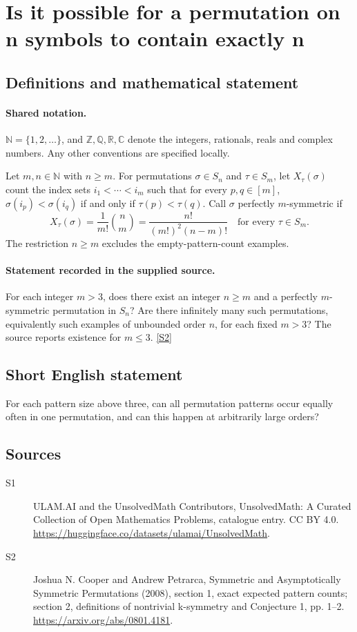 \documentclass[11pt]{article}
\newcommand{\sref}[2]{\hyperlink{source:#1:#2}{[S#2]}}
\begin{document}
\section{Is it possible for a permutation on n symbols to contain exactly n}\label{statement}

\subsection{Definitions and mathematical statement}

\paragraph{Shared notation.}$\mathbb N=\{1,2,\ldots\}$, and $\mathbb Z,\mathbb Q,\mathbb R,\mathbb C$ denote the integers, rationals, reals and complex numbers. Any other conventions are specified locally.


Let $m,n\in\mathbb N$ with $n\geq m$. For permutations $\sigma\in S_n$ and $\tau\in S_m$, let $X_\tau(\sigma)$ count the index sets $i_1<\cdots<i_m$ such that for every $p,q\in[m]$, $\sigma(i_p)<\sigma(i_q)$ if and only if $\tau(p)<\tau(q)$. Call $\sigma$ perfectly $m$-symmetric if
\[X_\tau(\sigma)=\frac1{m!}\binom nm=\frac{n!}{(m!)^2(n-m)!}\quad\text{for every }\tau\in S_m.\]
The restriction $n\geq m$ excludes the empty-pattern-count examples.
\paragraph{Statement recorded in the supplied source.}
For each integer $m>3$, does there exist an integer $n\geq m$ and a perfectly $m$-symmetric permutation in $S_n$? Are there infinitely many such permutations, equivalently such examples of unbounded order $n$, for each fixed $m>3$? The source reports existence for $m\leq3$. \sref{statement}{2}
\subsection{Short English statement}
For each pattern size above three, can all permutation patterns occur equally often in one permutation, and can this happen at arbitrarily large orders?
\subsection{Sources}
\begin{description}
\item[\hypertarget{source:statement:1}{S1}] ULAM.AI and the UnsolvedMath Contributors, UnsolvedMath: A Curated Collection of Open Mathematics Problems, catalogue entry. CC BY 4.0. \url{https://huggingface.co/datasets/ulamai/UnsolvedMath}.
\item[\hypertarget{source:statement:2}{S2}] Joshua N. Cooper and Andrew Petrarca, Symmetric and Asymptotically Symmetric Permutations (2008), section 1, exact expected pattern counts; section 2, definitions of nontrivial k-symmetry and Conjecture 1, pp. 1--2. \url{https://arxiv.org/abs/0801.4181}.
\end{description}
\label{end:statement}
\end{document}
